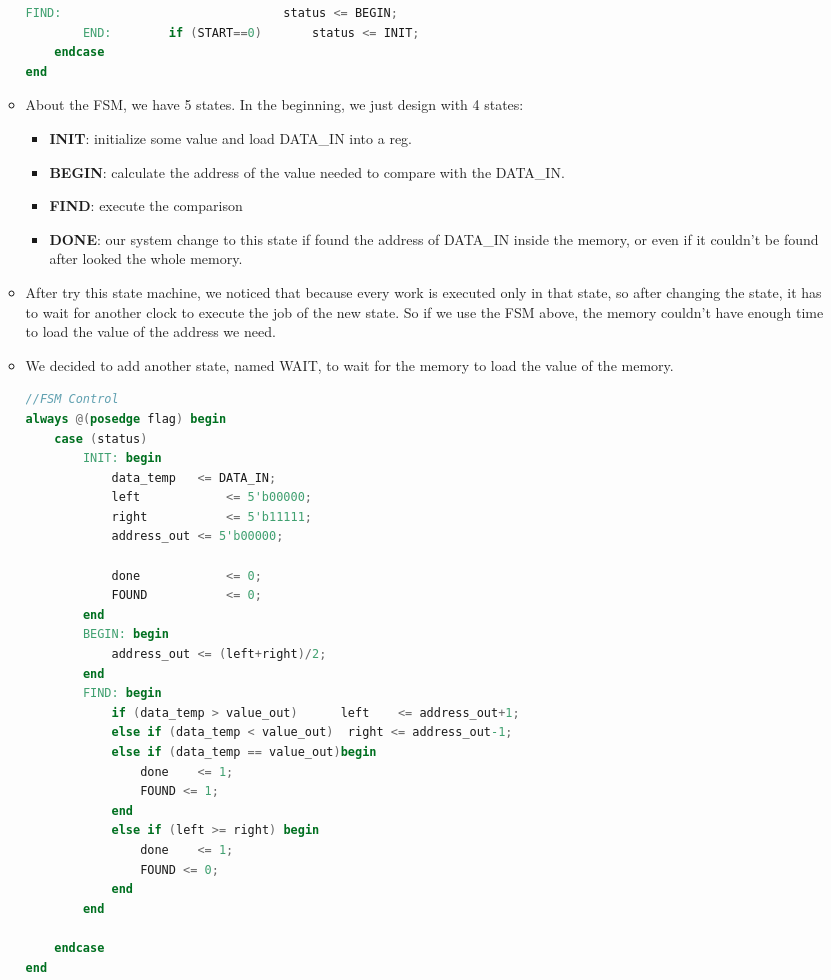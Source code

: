 \begin{itemize}
\begin{itemize}
\begin{lstlisting}[language=verilog]
        FIND:								status <= BEGIN;
        END:		if (START==0)		status <= INIT;
    endcase
end
                \end{lstlisting}
            \item []About the FSM, we have 5 states. In the beginning, we just design with 4 states:
                \begin{itemize}
                    \item \textbf{INIT}: initialize some value and load DATA\_IN into a reg.
                    \item \textbf{BEGIN}: calculate the address of the value needed to compare with the DATA\_IN.
                    \item \textbf{FIND}:  execute the comparison
                    \item \textbf{DONE}: our system change to this state if found the address of DATA\_IN inside the memory, or even if it couldn’t be found after looked the whole memory.
                \end{itemize}
            \item []After try this state machine, we noticed that because every work is executed only in that state, so after changing the state, it has to wait for another clock to execute the job of the new state. So if we use the FSM above, the memory couldn’t have  enough time to load the value of the address we need.
            \item []We decided to add another state, named WAIT, to wait for the memory to load the value of the memory.
                \begin{lstlisting}[language=verilog]
//FSM Control
always @(posedge flag) begin
    case (status)
        INIT: begin
            data_temp 	<= DATA_IN;
            left			<= 5'b00000;
            right			<= 5'b11111;
            address_out <= 5'b00000;
            
            done			<= 0;
            FOUND			<= 0;
        end
        BEGIN: begin
            address_out <= (left+right)/2;
        end
        FIND: begin
            if (data_temp > value_out) 		left 	<= address_out+1;
            else if (data_temp < value_out)  right <= address_out-1;
            else if (data_temp == value_out)begin 
                done	<= 1;
                FOUND <= 1;
            end
            else if (left >= right) begin
                done 	<= 1;
                FOUND <= 0;
            end
        end
    
    endcase
end
                \end{lstlisting}
        \end{itemize}
\end{itemize}
\newpage